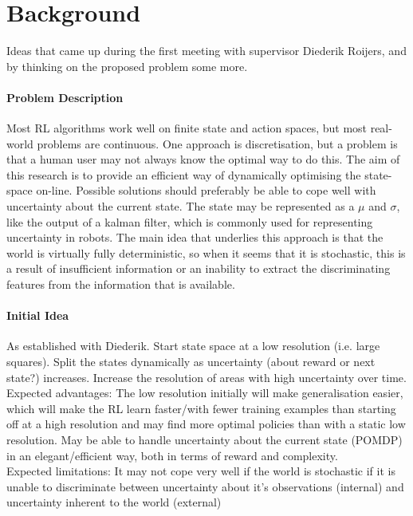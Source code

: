\documentclass{article}
\begin{document}
	\maketitle

	\section{Background}
	\label{sec:background}
	Ideas that came up during the first meeting with supervisor Diederik
	Roijers, and by thinking on the proposed problem some more.

	\paragraph{Problem Description}
	\label{par:problem_description}
	Most RL algorithms work well on finite state and action spaces, but most
	real-world problems are continuous. One approach is discretisation, but a
	problem is that a human user may not always know the optimal way to do this.
	The aim of this research is to provide an efficient way of dynamically
	optimising the state-space on-line.
	Possible solutions should preferably be able to cope well with uncertainty
	about the current state. The state may be represented as a $\mu$ and
	$\sigma$, like the output of a kalman filter, which is commonly used for
	representing uncertainty in robots.
	The main idea that underlies this approach is that the world is virtually
	fully deterministic, so when it seems that it is stochastic, this is a
	result of insufficient information or an inability to extract the
	discriminating features from the information that is available.

	\paragraph{Initial Idea}
	\label{par:initial_idea}
	As established with Diederik.
	Start state space at a low resolution (i.e. large squares).
	Split the states dynamically as uncertainty (about reward or next state?)
	increases. Increase the resolution of areas with high uncertainty over time.
	\\
	Expected advantages: The low resolution initially will make generalisation
	easier, which will make the RL learn faster/with fewer training examples
	than starting off at a high resolution and may find more optimal policies
	than with a static low resolution. May be able to handle uncertainty about
	the current state (POMDP) in an elegant/efficient way, both in terms of
	reward and complexity.
	\\
	Expected limitations: It may not cope very well if the world is stochastic
	if it is unable to discriminate between uncertainty about it's observations
	(internal) and uncertainty inherent to the world (external)
\end{document}
